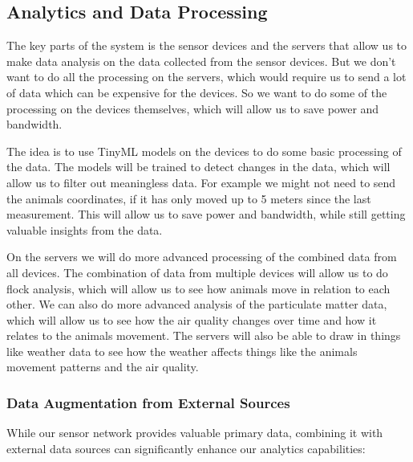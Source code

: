 \subsection{Analytics and Data Processing}

The key parts of the system is the sensor devices and the servers that allow us to make data analysis on the data collected from the sensor devices. But we don't want to do all the processing on the servers, which would require us to send a lot of data which can be expensive for the devices. So we want to do some of the processing on the devices themselves, which will allow us to save power and bandwidth. 

The idea is to use TinyML models on the devices to do some basic processing of the data. The models will be trained to detect changes in the data, which will allow us to filter out meaningless data. For example we might not need to send the animals coordinates, if it has only moved up to 5 meters since the last measurement. This will allow us to save power and bandwidth, while still getting valuable insights from the data.

On the servers we will do more advanced processing of the combined data from all devices. The combination of data from multiple devices will allow us to do flock analysis, which will allow us to see how animals move in relation to each other. We can also do more advanced analysis of the particulate matter data, which will allow us to see how the air quality changes over time and how it relates to the animals movement.
The servers will also be able to draw in things like weather data to see how the weather affects things like the animals movement patterns and the air quality.

\subsubsection{Data Augmentation from External Sources}
While our sensor network provides valuable primary data, combining it with external data sources can significantly enhance our analytics capabilities:

